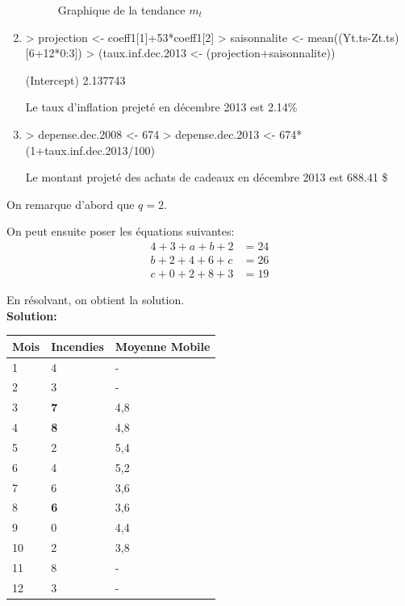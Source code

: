 \begin{solution}{1.1}
\begin{enumerate}
\begin{figure}[!ht]
\caption{Graphique de la tendance $m_t$}
\label{fig:exercice1-graph4}
\end{figure}
\item
\begin{Schunk}
\begin{Sinput}
> projection <- coeff1[1]+53*coeff1[2]
> saisonnalite <- mean((Yt.ts-Zt.ts)[6+12*0:3])
> (taux.inf.dec.2013 <- (projection+saisonnalite))
\end{Sinput}
\begin{Soutput}
(Intercept)
   2.137743
\end{Soutput}
\end{Schunk}
Le taux d'inflation prejeté en décembre 2013 est 2.14\%
\item
\begin{Schunk}
\begin{Sinput}
> depense.dec.2008 <- 674
> depense.dec.2013 <- 674*(1+taux.inf.dec.2013/100)
\end{Sinput}
\end{Schunk}
Le montant projeté des achats de cadeaux en décembre 2013 est 688.41 \$
\end{enumerate}
\end{solution}
\begin{solution}{1.2}
On remarque d'abord que $q=2$.

On peut ensuite poser les équations suivantes:
\begin{align}
\label{eq:1}
4+3+a+b+2 &= 24\\
b+2+4+6+c &= 26\\
c+0+2+8+3 &= 19
\end{align}

En résolvant, on obtient la solution.\\

\textbf{Solution:}\\

\begin{tabular}{|l|l|l|}
\hline
\multicolumn{1}{|l|}{Mois} & \multicolumn{1}{l|}{Incendies} & \multicolumn{1}{l|}{Moyenne Mobile} \\ \hline
1 & 4 & \multicolumn{1}{l|}{-} \\ \hline
2 & 3 & \multicolumn{1}{l|}{-} \\ \hline
3 & \textbf{7} & 4,8 \\ \hline
4 & \textbf{8} & 4,8 \\ \hline
5 & 2 & 5,4 \\ \hline
6 & 4 & 5,2 \\ \hline
7 & 6 & 3,6 \\ \hline
8 & \textbf{6} & 3,6 \\ \hline
9 & 0  & 4,4 \\ \hline
10 & 2 & 3,8 \\ \hline
11 & 8 & \multicolumn{1}{l|}{-} \\ \hline
12 & 3 & \multicolumn{1}{l|}{-} \\ \hline
\end{tabular}
\end{solution}
